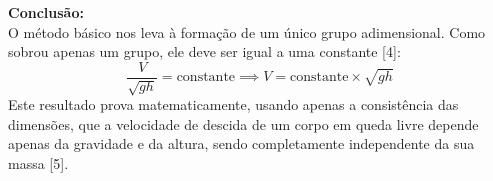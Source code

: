 \vspace{0.3cm}
\textbf{Conclusão:} \\
O método básico nos leva à formação de um único grupo adimensional. Como sobrou apenas um grupo, ele deve ser igual a uma constante [4]:
$$ \frac{V}{\sqrt{gh}} = \text{constante} \implies V = \text{constante} \times \sqrt{gh} $$
Este resultado prova matematicamente, usando apenas a consistência das dimensões, que a velocidade de descida de um corpo em queda livre depende apenas da gravidade e da altura, sendo completamente independente da sua massa [5].
